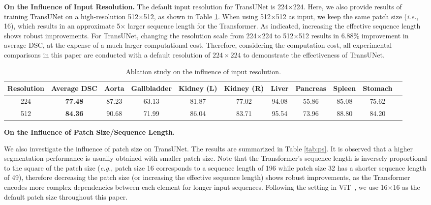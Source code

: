 \documentclass[runningheads]{llncs}
\begin{document}
\vspace{1ex}\noindent\textbf{On the Influence of Input Resolution.}
The default input resolution for TransUNet is 224$\times$224. Here, we also provide results of training TransUNet on a high-resolution 512$\times$512, as shown in Table \ref{tab:resolution}. When using 512$\times$512 as input, we keep the same patch size (\emph{i.e.}, 16), which results in an approximate 5$\times$ larger sequence length for the Transformer. As \cite{dosovitskiy2020image} indicated, increasing the effective sequence length shows robust improvements. For TransUNet, changing the resolution scale from 224$\times$224 to 512$\times$512 results in 6.88\% improvement in average DSC, at the expense of a much larger computational cost. 
Therefore, considering the computation cost, all experimental comparisons in this paper are conducted with a default resolution of $224 \times 224$ to demonstrate the effectiveness of TransUNet.

\vspace{-1em}
\begin{table}[]
\footnotesize
\resizebox{\textwidth}{!}
{
\begin{tabular}{c|c|ccccccccc}
\hline
Resolution         & Average DSC    & Aorta & Gallbladder & Kidney (L)  & Kidney (R) & Liver & Pancreas & Spleen & Stomach \\ \hline
224   & \textbf{77.48} & 87.23 & 63.13 & 81.87      & 77.02      & 94.08 & 55.86    & 85.08  & 75.62   \\ \hline

512 & \textbf{84.36} & 90.68 & 71.99       & 86.04      & 83.71      & 95.54 & 73.96    & 88.80  & 84.20   \\ \hline
\end{tabular}
}
\caption{Ablation study on the influence of input resolution.}
\label{tab:resolution}
\end{table}

\vspace{-1.5em}
\noindent\textbf{On the Influence of Patch Size/Sequence Length.}

We also investigate the influence of patch size on TransUNet. The results are summarized in Table \ref{tab:ps}. It is
observed that a higher segmentation performance is usually obtained with smaller patch size. 
Note that the Transformer's sequence length is inversely proportional to the square of the patch size (\emph{e.g.}, patch size 16 corresponds to a sequence length of 196 while patch size 32 has a shorter sequence length of 49), therefore decreasing the patch size (or increasing the effective sequence length) shows robust improvements, as the Transformer encodes more complex dependencies between each element for longer input sequences. Following the setting in ViT~\cite{dosovitskiy2020image}, we use 16$\times$16 as the default patch size throughout this paper. 
\end{document}
